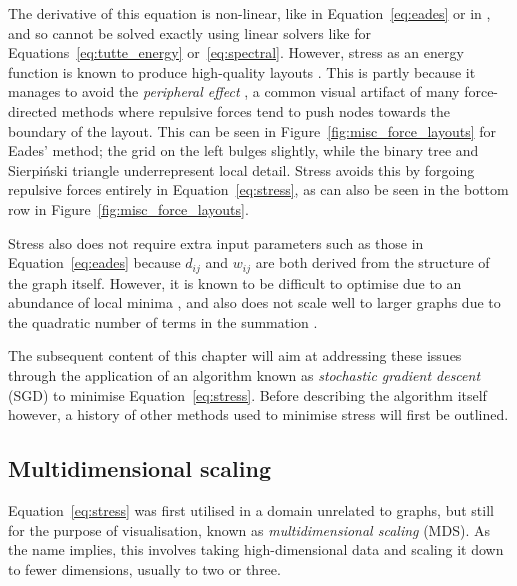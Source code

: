 The derivative of this equation is non-linear, like in Equation~\eqref{eq:eades} or in \citet{Fruchterman1991, Frick1995}, and so cannot be solved exactly using linear solvers like for Equations~\eqref{eq:tutte_energy} or~\eqref{eq:spectral}.
However, stress as an energy function is known to produce high-quality layouts \citep{Brandes2008}. This is partly because it manages to avoid the \emph{peripheral effect} \citep{Hu2005}, a common visual artifact of many force-directed methods where repulsive forces tend to push nodes towards the boundary of the layout.
This can be seen in Figure~\ref{fig:misc_force_layouts} for Eades' method; the grid on the left bulges slightly, while the binary tree and Sierpi\'nski triangle underrepresent local detail.
Stress avoids this by forgoing repulsive forces entirely in Equation~\eqref{eq:stress}, as can also be seen in the bottom row in Figure~\ref{fig:misc_force_layouts}.

Stress also does not require extra input parameters such as those in Equation~\eqref{eq:eades} because $d_{ij}$ and $w_{ij}$ are both derived from the structure of the graph itself.
However, it is known to be difficult to optimise due to an abundance of local minima \citep{DeLeeuw1988, Gansner2004}, and also does not scale well to larger graphs due to the quadratic number of terms in the summation \citep{Brandes2008, Hu2005}.

The subsequent content of this chapter will aim at addressing these issues through the application of an algorithm known as \emph{stochastic gradient descent} (SGD) to minimise Equation~\eqref{eq:stress}. Before describing the algorithm itself however, a history of other methods used to minimise stress will first be outlined.

\subsection{Multidimensional scaling}
\label{sec:stress_background}
Equation~\eqref{eq:stress} was first utilised in a domain unrelated to graphs, but still for the purpose of visualisation, known as \emph{multidimensional scaling} (MDS). As the name implies, this involves taking high-dimensional data and scaling it down to fewer dimensions, usually to two or three.

